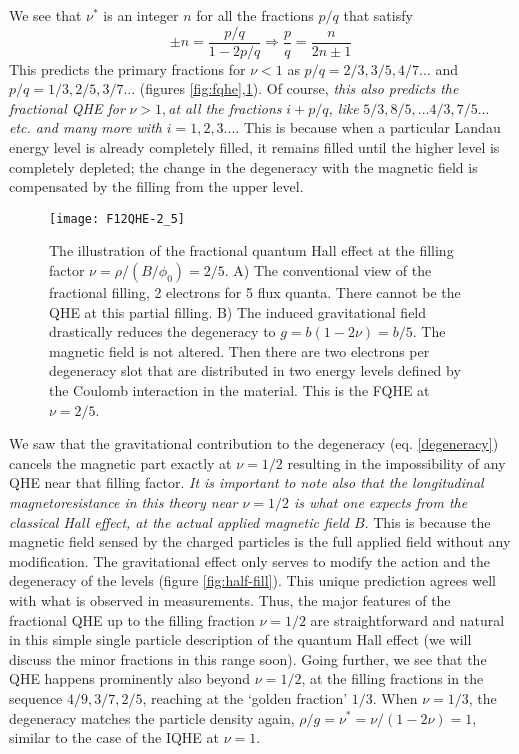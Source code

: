 \documentclass[aps,preprint,12pt,tightenlines]{revtex4}%
\begin{document}
We see that $\nu^{\ast}$ is an integer $n$ for all the fractions $p/q$ that
satisfy
\begin{equation}
	\pm n=\frac{p/q}{1-2p/q}\Longrightarrow\frac{p}{q}=\frac{n}{2n\pm1}%
\end{equation}
This predicts the primary fractions for $\nu<1$ as $p/q=2/3,3/5,4/7...$ and
$p/q=1/3,2/5,3/7...$ (figures \ref{fig:fqhe},\ref{fig:qhe-25}). Of course, \emph{this also predicts the fractional QHE
	for} $\nu>1,$\emph{at all the fractions }$i+p/q$\emph{, like }%
$5/3,8/5,...4/3,7/5...$\emph{ etc. and many more with} $i=1,2,3...$.  This is
because when a particular Landau energy level is already completely filled, it
remains filled until the higher level is completely depleted; the change in
the degeneracy with the magnetic field is compensated by the filling from the
upper level.

\begin{figure}
	\centering
	\texttt{[image: F12QHE-2\_5]}
	\caption{The illustration of the fractional quantum Hall effect at the filling factor $\nu=\rho/\left( B/\phi_{0}\right) =2/5$. A) The conventional view of the fractional filling, 2 electrons for 5 flux quanta. There cannot be the QHE at this partial filling. B) The induced gravitational field drastically reduces the degeneracy to $g=b(1-2\nu)=b/5$. The magnetic field is not altered. Then there are two electrons per degeneracy slot that are distributed in two energy levels defined by the Coulomb interaction in the material. This is the FQHE at $\nu=2/5$.}
	\label{fig:qhe-25}
\end{figure}

We saw that the gravitational contribution to the degeneracy (eq.
\ref{degeneracy}) cancels the magnetic part exactly at $\nu=1/2$ resulting in
the impossibility of any QHE near that filling factor. \emph{It is important to note
also that the longitudinal magnetoresistance in this theory near $\nu=1/2$ is
what one expects from the classical Hall effect, at the actual applied
magnetic field $B$}. This is because the magnetic field sensed by the charged
particles is the full applied field without any modification. The
gravitational effect only serves to modify the action and the degeneracy of
the levels (figure \ref{fig:half-fill}). This unique prediction agrees well with what is
observed in measurements. Thus, the major features of the fractional QHE up to
the filling fraction $\nu=1/2$ are straightforward and natural in this simple
single particle description of the quantum Hall effect (we will discuss the
minor fractions in this range soon). Going further, we see that the QHE
happens prominently also beyond $\nu=1/2$, at the filling fractions in the
sequence $4/9,3/7,2/5$, reaching at the `golden fraction' $1/3$. When
$\nu=1/3$,  the degeneracy matches the particle density again, $\rho
/g=\nu^{\ast}=\nu/(1-2\nu)=1$, similar to the case of the IQHE at $\nu=1$. 
\end{document}
